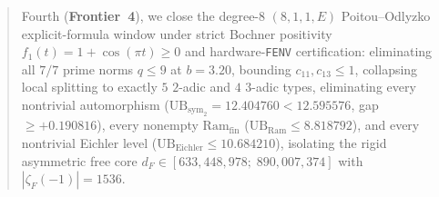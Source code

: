\documentclass[11pt]{amsart}
\numberwithin{equation}{section}
\theoremstyle{plain}
\theoremstyle{definition}\newtheorem{definition}[theorem]{Definition}
\theoremstyle{remark}\newtheorem{remark}[theorem]{Remark}
\newcommand{\Ram}{\mathrm{Ram}}
\begin{document}
\begin{abstract}
Fourth (\textbf{Frontier~4}), we close the degree-$8$ $(8,1,1,E)$ Poitou--Odlyzko explicit-formula window under strict Bochner positivity $f_1(t)=1+\cos(\pi t)\ge 0$ and hardware-\texttt{FENV} certification: eliminating all $7/7$ prime norms $q \le 9$ at $b=3.20$, bounding $c_{11}, c_{13} \le 1$, collapsing local splitting to exactly $5$ $2$-adic and $4$ $3$-adic types, eliminating every nontrivial automorphism ($\mathrm{UB}_{\mathrm{sym}_2} = 12.404760 < 12.595576$, gap $\ge +0.190816$), every nonempty $\Ram_{\mathrm{fin}}$ ($\mathrm{UB}_{\mathrm{Ram}} \le 8.818792$), and every nontrivial Eichler level ($\mathrm{UB}_{\mathrm{Eichler}} \le 10.684210$), isolating the rigid asymmetric free core $d_F \in [633{,}448{,}978;\; 890{,}007{,}374]$ with $|\zeta_F(-1)|=1536$.
\end{abstract}
\maketitle
\end{document}
